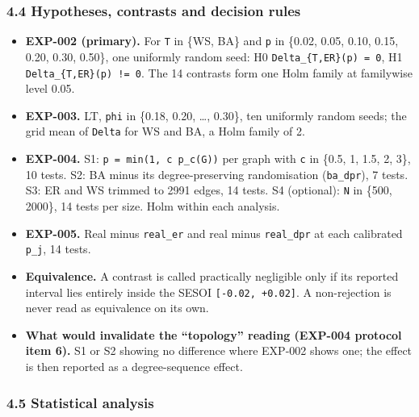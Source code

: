 \documentclass[
]{article}
\providecommand{\tightlist}{%
  \setlength{\itemsep}{0pt}\setlength{\parskip}{0pt}}
\begin{document}
\subsubsection{4.4 Hypotheses, contrasts and decision
rules}\label{hypotheses-contrasts-and-decision-rules}

\begin{itemize}
\tightlist
\item
  \textbf{EXP-002 (primary).} For \texttt{T} in \{WS, BA\} and
  \texttt{p} in \{0.02, 0.05, 0.10, 0.15, 0.20, 0.30, 0.50\}, one
  uniformly random seed: H0 \texttt{Delta\_\{T,ER\}(p)\ =\ 0}, H1
  \texttt{Delta\_\{T,ER\}(p)\ !=\ 0}. The 14 contrasts form one Holm
  family at familywise level 0.05.
\item
  \textbf{EXP-003.} LT, \texttt{phi} in \{0.18, 0.20, \ldots, 0.30\},
  ten uniformly random seeds; the grid mean of \texttt{Delta} for WS and
  BA, a Holm family of 2.
\item
  \textbf{EXP-004.} S1: \texttt{p\ =\ min(1,\ c\ p\_c(G))} per graph
  with \texttt{c} in \{0.5, 1, 1.5, 2, 3\}, 10 tests. S2: BA minus its
  degree-preserving randomisation (\texttt{ba\_dpr}), 7 tests. S3: ER
  and WS trimmed to 2991 edges, 14 tests. S4 (optional): \texttt{N} in
  \{500, 2000\}, 14 tests per size. Holm within each analysis.
\item
  \textbf{EXP-005.} Real minus \texttt{real\_er} and real minus
  \texttt{real\_dpr} at each calibrated \texttt{p\_j}, 14 tests.
\item
  \textbf{Equivalence.} A contrast is called practically negligible only
  if its reported interval lies entirely inside the SESOI
  \texttt{{[}-0.02,\ +0.02{]}}. A non-rejection is never read as
  equivalence on its own.
\item
  \textbf{What would invalidate the ``topology'' reading (EXP-004
  protocol item 6).} S1 or S2 showing no difference where EXP-002 shows
  one; the effect is then reported as a degree-sequence effect.
\end{itemize}

\subsubsection{4.5 Statistical analysis}\label{statistical-analysis}
\end{document}

